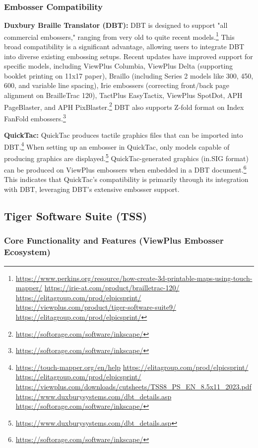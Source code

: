 \subsubsection{Embosser Compatibility}

\textbf{Duxbury Braille Translator (DBT):}
DBT is designed to support "all commercial embossers," ranging from very old to quite recent models.\footnote{\url{https://www.perkins.org/resource/how-create-3d-printable-maps-using-touch-mapper/} \url{https://irie-at.com/product/brailletrac-120/} \url{https://elitagroup.com/prod/elpicsprint/} \url{https://viewplus.com/product/tiger-software-suite9/} \url{https://elitagroup.com/prod/elpicsprint/}} This broad compatibility is a significant advantage, allowing users to integrate DBT into diverse existing embossing setups. Recent updates have improved support for specific models, including ViewPlus Columbia, ViewPlus Delta (supporting booklet printing on 11x17 paper), Braillo (including Series 2 models like 300, 450, 600, and variable line spacing), Irie embossers (correcting front/back page alignment on BrailleTrac 120), TactPlus EasyTactix, ViewPlus SpotDot, APH PageBlaster, and APH PixBlaster.\footnote{\url{https://softorage.com/software/inkscape/}} DBT also supports Z-fold format on Index FanFold embossers.\footnote{\url{https://softorage.com/software/inkscape/}}

\textbf{QuickTac:}
QuickTac produces tactile graphics files that can be imported into DBT.\footnote{\url{https://touch-mapper.org/en/help} \url{https://elitagroup.com/prod/elpicsprint/} \url{https://elitagroup.com/prod/elpicsprint/} \url{https://viewplus.com/downloads/cutsheets/TSS8_PS_EN_8.5x11_2023.pdf} \url{https://www.duxburysystems.com/dbt_details.asp} \url{https://softorage.com/software/inkscape/}} When setting up an embosser in QuickTac, only models capable of producing graphics are displayed.\footnote{\url{https://www.duxburysystems.com/dbt_details.asp}} QuickTac-generated graphics (in.SIG format) can be produced on ViewPlus embossers when embedded in a DBT document.\footnote{\url{https://softorage.com/software/inkscape/}} This indicates that QuickTac's compatibility is primarily through its integration with DBT, leveraging DBT's extensive embosser support.

\subsection{Tiger Software Suite (TSS)}

\subsubsection{Core Functionality and Features (ViewPlus Embosser Ecosystem)}

